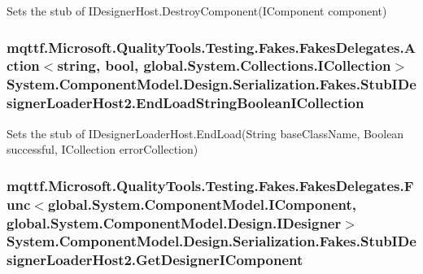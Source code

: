 Sets the stub of I\-Designer\-Host.\-Destroy\-Component(\-I\-Component component)

\hypertarget{class_system_1_1_component_model_1_1_design_1_1_serialization_1_1_fakes_1_1_stub_i_designer_loader_host2_a25409db7cc6853e17c60edfa74476129}{
\subsubsection[{End\-Load\-String\-Boolean\-I\-Collection}]{\setlength{\rightskip}{0pt plus 5cm}mqttf.\-Microsoft.\-Quality\-Tools.\-Testing.\-Fakes.\-Fakes\-Delegates.\-Action$<$string, bool, global.\-System.\-Collections.\-I\-Collection$>$ System.\-Component\-Model.\-Design.\-Serialization.\-Fakes.\-Stub\-I\-Designer\-Loader\-Host2.\-End\-Load\-String\-Boolean\-I\-Collection}}\label{class_system_1_1_component_model_1_1_design_1_1_serialization_1_1_fakes_1_1_stub_i_designer_loader_host2_a25409db7cc6853e17c60edfa74476129}


Sets the stub of I\-Designer\-Loader\-Host.\-End\-Load(\-String base\-Class\-Name, Boolean successful, I\-Collection error\-Collection)

\hypertarget{class_system_1_1_component_model_1_1_design_1_1_serialization_1_1_fakes_1_1_stub_i_designer_loader_host2_ae066608b8b804e2fa54da7e04adc2809}{
\subsubsection[{Get\-Designer\-I\-Component}]{\setlength{\rightskip}{0pt plus 5cm}mqttf.\-Microsoft.\-Quality\-Tools.\-Testing.\-Fakes.\-Fakes\-Delegates.\-Func$<$global.\-System.\-Component\-Model.\-I\-Component, global.\-System.\-Component\-Model.\-Design.\-I\-Designer$>$ System.\-Component\-Model.\-Design.\-Serialization.\-Fakes.\-Stub\-I\-Designer\-Loader\-Host2.\-Get\-Designer\-I\-Component}}\label{class_system_1_1_component_model_1_1_design_1_1_serialization_1_1_fakes_1_1_stub_i_designer_loader_host2_ae066608b8b804e2fa54da7e04adc2809}


